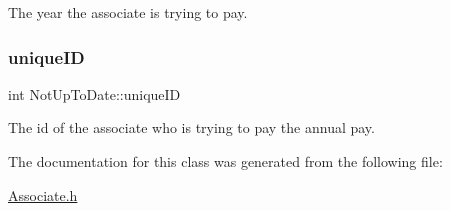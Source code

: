 The year the associate is trying to pay. 

\mbox{\label{classNotUpToDate_afa612d29a846c1e7b679fbb069035a72}} 
\subsubsection{\texorpdfstring{unique\+ID}{uniqueID}}
{\footnotesize\ttfamily int Not\+Up\+To\+Date\+::unique\+ID\hspace{0.3cm}{\ttfamily [private]}}



The id of the associate who is trying to pay the annual pay. 



The documentation for this class was generated from the following file\+:\begin{DoxyCompactItemize}
\item 
\hyperlink{Associate_8h}{Associate.\+h}\end{DoxyCompactItemize}
